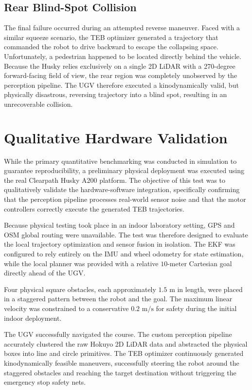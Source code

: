 \subsection{Rear Blind-Spot Collision}
The final failure occurred during an attempted reverse maneuver. Faced with a similar squeeze scenario, the TEB optimizer generated a trajectory that commanded the robot to drive backward to escape the collapsing space. Unfortunately, a pedestrian happened to be located directly behind the vehicle. Because the Husky relies exclusively on a single 2D LiDAR with a 270-degree forward-facing field of view, the rear region was completely unobserved by the perception pipeline. The UGV therefore executed a kinodynamically valid, but physically disastrous, reversing trajectory into a blind spot, resulting in an unrecoverable collision. 

\section{Qualitative Hardware Validation}
\label{sec:hardware-validation}

While the primary quantitative benchmarking was conducted in simulation to guarantee reproducibility, a preliminary physical deployment was executed using the real Clearpath Husky A200 platform. The objective of this test was to qualitatively validate the hardware-software integration, specifically confirming that the perception pipeline processes real-world sensor noise and that the motor controllers correctly execute the generated TEB trajectories.

Because physical testing took place in an indoor laboratory setting, GPS and OSM global routing were unavailable. The test was therefore designed to evaluate the local trajectory optimization and sensor fusion in isolation. The EKF was configured to rely entirely on the IMU and wheel odometry for state estimation, while the local planner was provided with a relative $10\text{-meter}$ Cartesian goal directly ahead of the UGV. 

Four physical square obstacles, each approximately $1.5\text{ m}$ in length, were placed in a staggered pattern between the robot and the goal. The maximum linear velocity was constrained to a conservative $0.2\text{ m/s}$ for safety during the initial indoor deployment.

The UGV successfully navigated the course. The custom perception pipeline accurately clustered the raw Hokuyo 2D LiDAR data and abstracted the physical boxes into line and circle primitives. The TEB optimizer continuously generated kinodynamically feasible maneuvers, successfully steering the robot around the staggered obstacles and reaching the target destination without triggering the emergency stop safety nets. 

